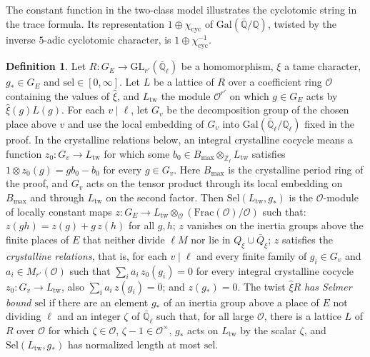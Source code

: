 \documentclass[reqno]{amsart}
\theoremstyle{definition}
\newtheorem{definition}{Definition}[section]
\theoremstyle{plain}
\newcommand{\Z}{\mathbb{Z}}
\newcommand{\Q}{\mathbb{Q}}
\newcommand{\Oc}{\mathcal{O}}
\newcommand{\GL}{\mathrm{GL}}
\newcommand{\cyc}{\chi_{\mathrm{cyc}}}
\begin{document}
The constant function in the two-class model illustrates the cyclotomic string in the trace formula.  Its representation \(1\oplus\cyc\) of \(\mathrm{Gal}(\bar{\Q}/\Q)\), twisted by the inverse \(5\)-adic cyclotomic character, is \(1\oplus\cyc^{-1}\).

\begin{definition}\label{def:selmer-bound}
Let \(R \colon G_E \to \GL_{r'}(\bar{\Q}_\ell)\) be a homomorphism, \(\xi\) a tame character, \(g_* \in G_E\) and \(\mathrm{sel} \in [0, \infty]\).  Let \(L\) be a lattice of \(R\) over a coefficient ring \(\Oc\) containing the values of \(\hat\xi\), and \(L_{\mathrm{tw}}\) the module \(\Oc^{r'}\) on which \(g \in G_E\) acts by \(\hat\xi(g)L(g)\).  For each \(v\mid\ell\), let \(G_v\) be the decomposition group of the chosen place above \(v\) and use the local embedding of \(G_v\) into \(\mathrm{Gal}(\bar{\Q}_\ell/\Q_\ell)\) fixed in the proof.  In the crystalline relations below, an integral crystalline cocycle means a function \(z_0\colon G_v\to L_{\mathrm{tw}}\) for which some \(b_0\in B_{\max}\otimes_{\Z_\ell} L_{\mathrm{tw}}\) satisfies \(1\otimes z_0(g)=g b_0-b_0\) for every \(g\in G_v\).  Here \(B_{\max}\) is the crystalline period ring of the proof, and \(G_v\) acts on the tensor product through its local embedding on \(B_{\max}\) and through \(L_{\mathrm{tw}}\) on the second factor.  Then \(\mathrm{Sel}(L_{\mathrm{tw}}, g_*)\) is the \(\Oc\)-module of locally constant maps \(z \colon G_E \to L_{\mathrm{tw}} \otimes_{\Oc} (\mathrm{Frac}(\Oc)/\Oc)\) such that: \(z(gh) = z(g) + g\,z(h)\) for all \(g, h\); \(z\) vanishes on the inertia groups above the finite places of \(E\) that neither divide \(\ell M\) nor lie in \(Q_\xi \cup \bar Q_\xi\); \(z\) satisfies the \emph{crystalline relations}, that is, for each \(v\mid\ell\) and every finite family of \(g_i \in G_v\) and \(a_i \in M_{r'}(\Oc)\) such that \(\sum_i a_i\,z_0(g_i) = 0\) for every integral crystalline cocycle \(z_0 \colon G_v \to L_{\mathrm{tw}}\), also \(\sum_i a_i\,z(g_i) = 0\); and \(z(g_*) = 0\).  The twist \(\hat\xi R\) \emph{has Selmer bound \(\mathrm{sel}\)} if there are an element \(g_*\) of an inertia group above a place of \(E\) not dividing \(\ell\) and an integer \(\zeta\) of \(\bar{\Q}_\ell\) such that, for all large \(\Oc\), there is a lattice \(L\) of \(R\) over \(\Oc\) for which \(\zeta \in \Oc\), \(\zeta - 1 \in \Oc^\times\), \(g_*\) acts on \(L_{\mathrm{tw}}\) by the scalar \(\zeta\), and \(\mathrm{Sel}(L_{\mathrm{tw}}, g_*)\) has normalized length at most \(\mathrm{sel}\).
\end{definition}
\end{document}
